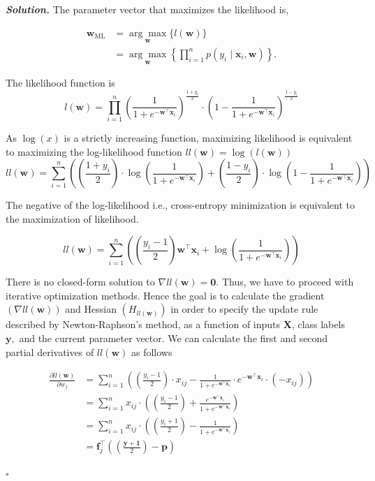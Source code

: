 \documentclass[10pt]{article}
\newenvironment{solution}[1][\it{Solution}]{\textbf{#1. } }{$\square$}
\begin{document}
\begin{solution}
The parameter vector that maximizes the likelihood is,

$$
\begin{aligned}
\mathbf{w}_{\mathrm{ML}} &=\underset{\mathbf{w}}{\arg \max }\{l(\mathbf{w})\} \\
&=\underset{\mathbf{w}}{\arg \max }\left\{\prod_{i=1}^{n} p\left(y_{i} \mid \mathbf{x}_{i}, \mathbf{w}\right)\right\} .
\end{aligned}
$$

The likelihood function is
$$
l(\mathbf{w})=\prod_{i=1}^{n}\left(\frac{1}{1+e^{-\mathbf{w}^{\top} \mathbf{x}_{i}}}\right)^{\frac{1+y_{i}}{2}} \cdot\left(1-\frac{1}{1+e^{-\mathbf{w}^{\top} \mathbf{x}_{i}}}\right)^{\frac{1-y_{i}}{2}}
$$

As $\log(x)$ is a strictly increasing function, maximizing likelihood is equivalent to maximizing the log-likelihood function $l l(\mathbf{w})=\log (l(\mathbf{w}))$
$$
l l(\mathbf{w})=\sum_{i=1}^{n}\left(\left(\frac{1+y_{i}}{2}\right) \cdot \log \left(\frac{1}{1+e^{-\mathbf{w}^{\top} \mathbf{x}_{i}}}\right)+\left(\frac{1-y_{i}}{2}\right) \cdot \log \left(1-\frac{1}{1+e^{-\mathbf{w}^{\top} \mathbf{x}_{i}}}\right)\right)
$$

The negative of the log-likelihood i.e., cross-entropy minimization is equivalent to the maximization of likelihood.

$$
ll(\mathbf{w})=\sum_{i=1}^{n}\left(\left(\frac{y_{i}-1}{2}\right) \mathbf{w}^{\top} \mathbf{x}_{i}+\log \left(\frac{1}{1+e^{-\mathbf{w}^{\top} \mathbf{x}_{i}}}\right)\right)
$$

There is no closed-form solution to $\nabla ll(\mathbf{w})=\mathbf{0}$. Thus, we have to proceed with iterative optimization methods. Hence the goal is to calculate the gradient $(\nabla ll(\mathbf{w}))$ and Hessian $\left(H_{l l(\mathbf{w})}\right)$ in order to specify the update rule described by Newton-Raphson's method, as a function of inputs $\mathbf{X}$, class labels $\mathbf{y},$ and the current parameter vector. We can calculate the first and second partial derivatives of $ll(\mathbf{w})$ as follows

$$
\begin{aligned}
\frac{\partial ll(\mathbf{w})}{\partial w_{j}} &=\sum_{i=1}^{n}\left(\left(\frac{y_{i}-1}{2}\right) \cdot x_{i j}-\frac{1}{1+e^{-\mathbf{w}^{\top} \mathbf{x}_{i}}} \cdot e^{-\mathbf{w}^{\top} \mathbf{x}_{i}} \cdot\left(-x_{i j}\right)\right) \\
&=\sum_{i=1}^{n} x_{i j} \cdot\left(\left(\frac{y_{i}-1}{2}\right)+\frac{e^{-\mathbf{w}^{\top} \mathbf{x}_{i}}}{1+e^{-\mathbf{w}^{\top} \mathbf{x}_{i}}}\right) \\
&=\sum_{i=1}^{n} x_{i j} \cdot\left(\left(\frac{y_{i} + 1}{2}\right)-\frac{1}{1+e^{-\mathbf{w}^{\top} \mathbf{x}_{i}}}\right) \\
&=\mathbf{f}_{j}^{\top}\left(\left(\frac{\mathbf{y}+\mathbf{1}}{2}\right)-\mathbf{p}\right)
\end{aligned}
$$


\end{solution}
\end{document}

